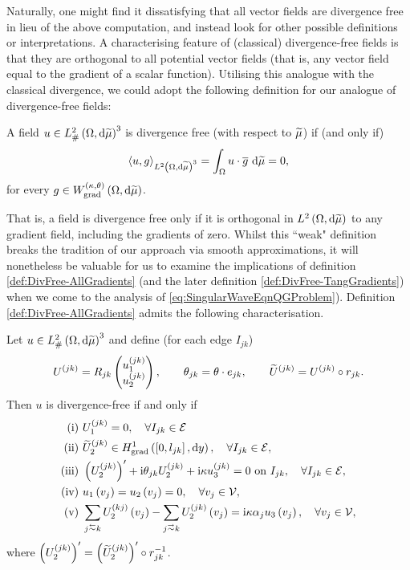 Naturally, one might find it dissatisfying that all vector fields are divergence free in lieu of the above computation, and instead look for other possible definitions or interpretations.
A characterising feature of (classical) divergence-free fields is that they are orthogonal to all potential vector fields (that is, any vector field equal to the gradient of a scalar function).
Utilising this analogue with the classical divergence, we could adopt the following definition for our analogue of divergence-free fields:
\begin{definition} \label{def:DivFree-AllGradients}
	A field $u\in L^2_{\#}\left( \Omega,\mathrm{d} \widetilde{\mu} \right)^3$ is divergence free (with respect to $\widetilde{\mu}$) if (and only if)
	\begin{align*}
		\left\langle u , g \right\rangle_{L^{2}\left( \Omega,\mathrm{d} \widetilde{\mu} \right)^3} = \int_{\Omega} u\cdot\overline{g}  \ \mathrm{d}\widetilde{\mu} = 0,
	\end{align*}
	for every $g\in W_{\mathrm{grad}}^{\left( \kappa, \theta \right)}\left( \Omega,\mathrm{d}\widetilde{\mu} \right)$.
\end{definition}
That is, a field is divergence free only if it is orthogonal in $L^{2}\left( \Omega,\mathrm{d} \widetilde{\mu} \right)$ to any gradient field, including the gradients of zero.
Whilst this ``weak" definition breaks the tradition of our approach via smooth approximations, it will nonetheless be valuable for us to examine the implications of definition \ref{def:DivFree-AllGradients} (and the later definition \ref{def:DivFree-TangGradients}) when we come to the analysis of \eqref{eq:SingularWaveEqnQGProblem}).
Definition \ref{def:DivFree-AllGradients} admits the following characterisation.
\begin{prop} \label{prop:DivFree-AllGradsConditions}
	Let $u\in L^2_{\#}\left( \Omega,\mathrm{d} \widetilde{\mu} \right)^3$ and define (for each edge $I_{jk}$)
	\begin{align*}
		U^{(jk)} = R_{jk}\begin{pmatrix} u_1^{(jk)} \\ u_2^{(jk)} \end{pmatrix}, 
		\qquad \theta_{jk} = \theta\cdot e_{jk}, 
		\qquad \widetilde{U}^{(jk)} = U^{(jk)}\circ r_{jk}.
	\end{align*}		
	Then $u$ is divergence-free if and only if
	\begin{align*}
		\mathrm{(i)} \ & U_1^{(jk)} = 0, \quad \forall I_{jk}\in\edgeSet \\
		\mathrm{(ii)} \ & \widetilde{U}_2^{(jk)}\in\gradSob{\sqbracs{0,l_{jk}}}{y}, \quad \forall I_{jk}\in\edgeSet, \\
		\mathrm{(iii)} \ & \bracs{U_2^{(jk)}}' + \rmi\qm_{jk}U_2^{(jk)} + \rmi\wavenumber u_3^{(jk)} = 0 \text{ on } I_{jk}, \quad \forall I_{jk}\in\edgeSet, \\
		\mathrm{(iv)} \ & u_1\bracs{v_j} = u_2\bracs{v_j} = 0, \quad \forall v_j\in\vertSet, \\
		\mathrm{(v)} \ & \sum_{j\conRight k}U_2^{(kj)}\bracs{v_j} - \sum_{j\conLeft k}U_2^{(jk)}\bracs{v_j} = \rmi\wavenumber\alpha_j u_3\bracs{v_j}, \quad \forall v_j\in\vertSet,
	\end{align*}
	where $\left( U_2^{(jk)} \right)' = \left( \widetilde{U}_2^{(jk)} \right)'\circ r_{jk}^{-1}$.
\end{prop}
